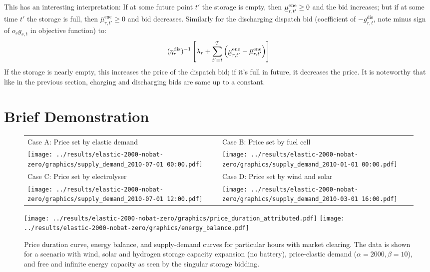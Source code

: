 \documentclass[final,3p]{elsarticle}
\def\l{\lambda} \def\K{\kappa} \def\m{\mu} \def\G{\Gamma} \def\d{\partial}
\begin{document}
This has an interesting interpretation: If at some future point $t'$ the storage
is empty, then $\ubar{\mu}^{\textrm{ene}}_{r,t'} \geq 0$  and the bid increases;
but if at some time $t'$ the storage is full, then
$\bar{\mu}^{\textrm{ene}}_{r,t'} \geq 0$ and bid decreases.
Similarly for the discharging dispatch bid (coefficient of
$-g^{\textrm{dis}}_{r,t}$, note minus sign of $o_sg_{s,t}$ in objective
function) to:
\begin{equation}
  (\eta^{\textrm{dis}}_r)^{-1}\left[ \l_r + \sum_{t'=t}^T \left(\ubar{\mu}^{\textrm{ene}}_{r,t'} - \bar{\mu}^{\textrm{ene}}_{r,t'}  \right)\right]
\end{equation}
If the storage is nearly empty, this increases the price of the dispatch bid; if
it's full in future, it decreases the price. It is noteworthy that like in the
previous section, charging and discharging bids are same up to a constant.

\section*{Brief Demonstration}

\begin{figure}
	\footnotesize\sffamily
	\begin{tabular}{ll}
		Case A: Price set by elastic demand & Case B: Price set by fuel cell \\
		\texttt{[image: ../results/elastic-2000-nobat-zero/graphics/supply\_demand\_2010-07-01 00:00.pdf]} &
		\texttt{[image: ../results/elastic-2000-nobat-zero/graphics/supply\_demand\_2010-01-01 00:00.pdf]} \\
		Case C: Price set by electrolyser & Case D: Price set by wind and solar \\
		\texttt{[image: ../results/elastic-2000-nobat-zero/graphics/supply\_demand\_2010-07-01 12:00.pdf]} &
		\texttt{[image: ../results/elastic-2000-nobat-zero/graphics/supply\_demand\_2010-03-01 16:00.pdf]} \\
	\end{tabular}
	\centering
	\texttt{[image: ../results/elastic-2000-nobat-zero/graphics/price\_duration\_attributed.pdf]}
	\texttt{[image: ../results/elastic-2000-nobat-zero/graphics/energy\_balance.pdf]}
	\caption{Price duration curve, energy balance, and supply-demand curves for particular hours with market clearing. The data is shown for a scenario with wind, solar and hydrogen storage capacity expansion (no battery), price-elastic demand ($\alpha=2000, \beta=10$), and free and infinite energy capacity as seen by the singular storage bidding. }
	\label{fig:supply-demand}
\end{figure}
\end{document}
